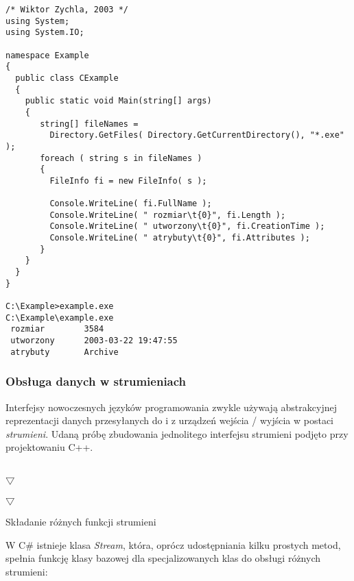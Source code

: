 \begin{scriptsize}
\begin{verbatim}
/* Wiktor Zychla, 2003 */
using System;
using System.IO;

namespace Example
{
  public class CExample 
  {
    public static void Main(string[] args)
    {
       string[] fileNames = 
         Directory.GetFiles( Directory.GetCurrentDirectory(), "*.exe" );
       foreach ( string s in fileNames )
       {
         FileInfo fi = new FileInfo( s );

         Console.WriteLine( fi.FullName );
         Console.WriteLine( " rozmiar\t{0}", fi.Length );
         Console.WriteLine( " utworzony\t{0}", fi.CreationTime );
         Console.WriteLine( " atrybuty\t{0}", fi.Attributes );
       }
    }
  }
}

C:\Example>example.exe
C:\Example\example.exe
 rozmiar        3584
 utworzony      2003-03-22 19:47:55
 atrybuty       Archive
\end{verbatim}
\end{scriptsize}

\subsubsection{Obsługa danych w strumieniach}

Interfejsy nowoczesnych języków programowania zwykle używają abstrakcyjnej reprezentacji
danych przesyłanych do i z urządzeń wejścia / wyjścia w postaci {\em strumieni}. Udaną próbę
zbudowania jednolitego interfejsu strumieni podjęto przy projektowaniu C++.

\begin{table}[ht]
	\begin{center}

	  \\ $\bigtriangledown$ \\
	             \\ $\bigtriangledown$ \\

	\end{center}
\caption{Składanie różnych funkcji strumieni} 
\label{tab:Streams}
\end{table}

W C\# istnieje klasa {\em Stream}, która, oprócz udostępniania kilku prostych metod, spełnia
funkcję klasy bazowej dla specjalizowanych klas do obsługi różnych strumieni:

